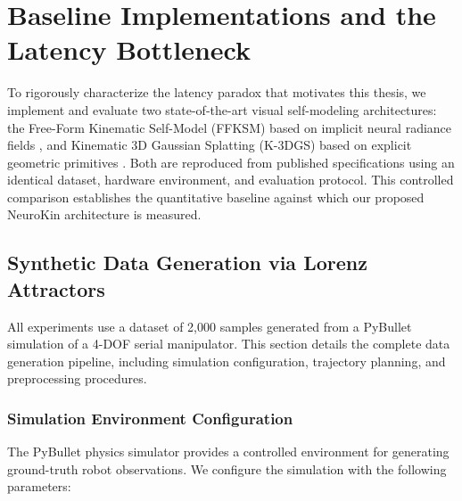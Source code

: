 \documentclass[12pt,a4paper,oneside]{report}
\begin{document}

\chapter{Baseline Implementations and the Latency Bottleneck}
\label{chap:baseline_latency_bottleneck}

To rigorously characterize the latency paradox that motivates this thesis, we implement and evaluate two state-of-the-art visual self-modeling architectures: the Free-Form Kinematic Self-Model (FFKSM) based on implicit neural radiance fields \cite{hu2024teaching}, and Kinematic 3D Gaussian Splatting (K-3DGS) based on explicit geometric primitives \cite{hu2025learning}. Both are reproduced from published specifications using an identical dataset, hardware environment, and evaluation protocol. This controlled comparison establishes the quantitative baseline against which our proposed NeuroKin architecture is measured.

\section{Synthetic Data Generation via Lorenz Attractors}

All experiments use a dataset of 2,000 samples generated from a PyBullet simulation of a 4-DOF serial manipulator. This section details the complete data generation pipeline, including simulation configuration, trajectory planning, and preprocessing procedures.

\subsection{Simulation Environment Configuration}
\label{subsec:simulation_environment_configuration}

The PyBullet physics simulator provides a controlled environment for generating ground-truth robot observations. We configure the simulation with the following parameters:
\end{document}
